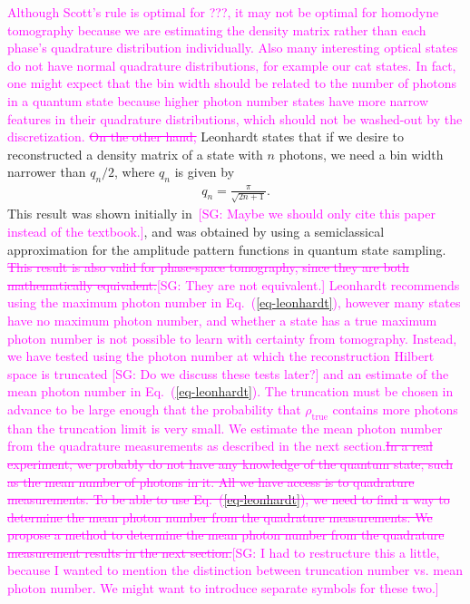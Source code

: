 \documentclass[
reprint,
superscriptaddress,
showpacs,
amsmath,
amssymb,
aps,
pra,
longbibliography
]{revtex4-1}
\providecommand{\aucmnt}[1]{#1}
\providecommand{\editcolor}[2]{\textcolor{#1}{#2}}
\providecommand{\aucmnt}[1]{}
\providecommand{\editcolor}[2]{#2}
\newcommand{\SG}[1]{\editcolor{magenta}{#1}}
\newcommand{\SGs}[1]{\aucmnt{\editcolor{magenta}{\sout{#1}}}}
\newcommand{\SGc}[1]{\aucmnt{\editcolor{magenta}{[SG: #1]}}}
\newcommand{\rhotrue}{\rho_{\text{true}}}
\begin{document}
\SG{Although Scott's rule is optimal for ???, it may not be optimal
  for homodyne tomography because we are estimating the density matrix
  rather than each phase's quadrature distribution individually.  Also
  many interesting optical states do not have normal quadrature
  distributions, for example our cat states.  In fact, one might
  expect that the bin width should be related to the number of photons
  in a quantum state because higher photon number states have more
  narrow features in their quadrature distributions, which should not
  be washed-out by the discretization.} \SGs{On the other hand,}
Leonhardt states that if we desire to reconstructed a density matrix
of a state with $n$ photons, we need a bin width narrower than
$q_n/2$, where $q_n$ is given by
\begin{eqnarray}
  q_n = \frac{\pi}{\sqrt{2 n + 1}}.
  \label{eq-leonhardt}
\end{eqnarray}
This result was shown initially in~\cite{Leonhardt1996}\SGc{Maybe we
  should only cite this paper instead of the textbook.}, and was
obtained by using a semiclassical approximation for the amplitude
pattern functions in quantum state sampling. \SGs{This result is also
  valid for phase-space tomography, since they are both mathematically
  equivalent.}\SGc{They are not equivalent.} \SG{Leonhardt recommends
  using the maximum photon number in Eq.~(\ref{eq-leonhardt}), however
  many states have no maximum photon number, and whether a state has a
  true maximum photon number is not possible to learn with certainty
  from tomography.  Instead, we have tested using the photon number at
  which the reconstruction Hilbert space is truncated \SGc{Do we
    discuss these tests later?} and an estimate of the mean photon
  number in Eq.~(\ref{eq-leonhardt}).  The truncation must be chosen
  in advance to be large enough that the probability that $\rhotrue$
  contains more photons than the truncation limit is very small.  We
  estimate the mean photon number from the quadrature measurements as
  described in the next section.}\SGs{In a real experiment, we
  probably do not have any knowledge of the quantum state, such as the
  mean number of photons in it. All we have access is to quadrature
  measurements. To be able to use Eq.~(\ref{eq-leonhardt}), we need to
  find a way to determine the mean photon number from the quadrature
  measurements. We propose a method to determine the mean photon
  number from the quadrature measurement results in the next
  section.}\SGc{I had to restructure this a little, because I wanted
  to mention the distinction between truncation number vs. mean photon
  number.  We might want to introduce separate symbols for these two.}
\end{document}
